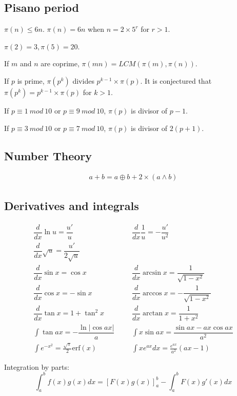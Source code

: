\documentclass[A4 paper, 12pt, oneside, landscape]{article}
\begin{document}
\begin{multicols}{2}
    \subsection{Pisano period}
    $\pi(n) \leq 6n.$ $\pi(n) = 6n$ when $n = 2 \times 5^r$ for $r > 1$. \par 
    $\pi(2) = 3, \pi(5) = 20$. \par 
    If $m$ and $n$ are coprime, $\pi(mn) = LCM(\pi(m), \pi(n))$. \par
    If $p$ is prime, $\pi(p^k)$ divides $p^{k - 1} \times \pi(p)$. It is conjectured that $\pi(p^k) = p^{k - 1} \times \pi(p)$ for $k > 1$. \par
    If $p \equiv 1 \ mod \ 10$ or $p \equiv 9 \ mod \ 10$, $\pi(p)$ is divisor of $p - 1$. \par 
    If $p \equiv 3 \ mod \ 10$ or $p \equiv 7 \ mod \ 10$, $\pi(p)$ is divisor of $2(p + 1)$.
    
    \subsection{Number Theory}
    \begin{align*}
        a + b = a \oplus b + 2 \times (a \wedge b)
    \end{align*}
    
	\subsection{Derivatives and integrals}
	\begin{align*}
        \dfrac{d}{dx}\ln{u} = \dfrac{u'}{u} &&& \dfrac{d}{dx}\dfrac{1}{u} = -\dfrac{u'}{u^2} \\
    	\dfrac{d}{dx}\sqrt u = \dfrac{u'}{2\sqrt u} \\
    	\dfrac{d}{dx}\sin x = \cos x &&& \dfrac{d}{dx}\arcsin x = \dfrac{1}{\sqrt{1-x^2}} \\ 
    	\dfrac{d}{dx}\cos x = -\sin x &&& \dfrac{d}{dx}\arccos x = -\dfrac{1}{\sqrt{1-x^2}} \\
    	\dfrac{d}{dx}\tan x = 1+\tan^2 x &&& \dfrac{d}{dx}\arctan x = \dfrac{1}{1+x^2} \\
    	\int\tan ax = -\dfrac{\ln|\cos ax|}{a} &&& \int x\sin ax = \dfrac{\sin ax-ax \cos ax}{a^2} \\
    	\int e^{-x^2} = \frac{\sqrt \pi}{2} \text{erf}(x) &&& \int xe^{ax}dx = \frac{e^{ax}}{a^2}(ax-1)
	\end{align*}

    Integration by parts:
    \[\int_a^bf(x)g(x)dx = [F(x)g(x)]_a^b-\int_a^bF(x)g'(x)dx\]	
	

\end{multicols}
\end{document}
